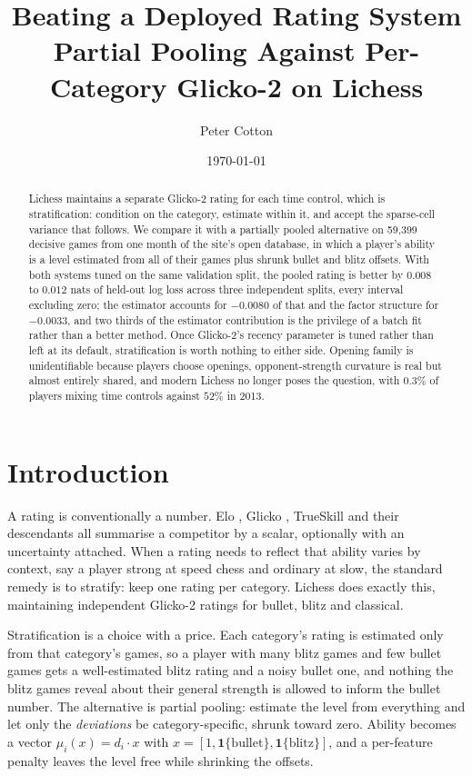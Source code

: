 \documentclass[11pt]{article}
\title{\textbf{Beating a Deployed Rating System}\\[0.4em]
\large Partial Pooling Against Per-Category Glicko-2 on Lichess}
\author{Peter Cotton}
\date{\today}
\begin{document}
\maketitle

\begin{abstract}
\noindent Lichess maintains a separate Glicko-2 rating for each time
control, which is stratification: condition on the category, estimate
within it, and accept the sparse-cell variance that follows. We compare
it with a partially pooled alternative on 59{,}399 decisive games from
one month of the site's open database, in which a player's ability is a
level estimated from all of their games plus shrunk bullet and blitz
offsets. With both systems tuned on the same validation split, the
pooled rating is better by $0.008$ to $0.012$ nats of held-out log loss
across three independent splits, every interval excluding zero; the
estimator accounts for $-0.0080$ of that and the factor structure for
$-0.0033$, and two thirds of the estimator contribution is the
privilege of a batch fit rather than a better method. Once Glicko-2's
recency parameter is tuned rather than left at its default,
stratification is worth nothing to either side. Opening family is unidentifiable because players
choose openings, opponent-strength curvature is real but almost
entirely shared, and modern Lichess no longer poses the question, with
$0.3\%$ of players mixing time controls against $52\%$ in 2013.
\end{abstract}

\section{Introduction}

A rating is conventionally a number. Elo \citep{elo1978},
Glicko \citep{glickman1999}, TrueSkill \citep{herbrich2007} and their
descendants all summarise a competitor by a scalar, optionally with an
uncertainty attached. When a rating needs to reflect that ability
varies by context, say a player strong at speed chess and ordinary at
slow, the standard remedy is to stratify: keep one rating per
category. Lichess does exactly this, maintaining independent Glicko-2
ratings for bullet, blitz and classical.

Stratification is a choice with a price. Each category's rating is
estimated only from that category's games, so a player with many blitz
games and few bullet games gets a well-estimated blitz rating and a
noisy bullet one, and nothing the blitz games reveal about their
general strength is allowed to inform the bullet number. The
alternative is partial pooling: estimate the level from everything and
let only the \emph{deviations} be category-specific, shrunk toward
zero. Ability becomes a vector $\mu_i(x) = d_i \cdot x$ with
$x = [1, \mathbf{1}\{\text{bullet}\}, \mathbf{1}\{\text{blitz}\}]$,
and a per-feature penalty leaves the level free while shrinking the
offsets.
\end{document}
